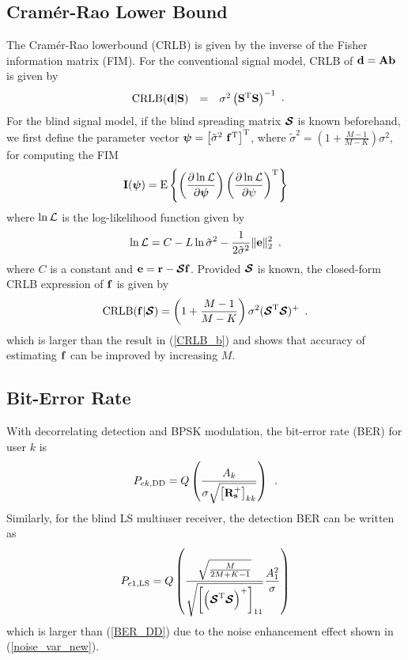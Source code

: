 \documentclass[conference]{IEEEtran}
\newcommand{\br}{{\mathbf r}}
\newcommand{\bA}{{\mathbf A}}
\newcommand{\bb}{{\bf b}}
\newcommand{\bd}{{\bf d}}
\newcommand{\be}{{\bf e}}
\newcommand{\bs}{{\bf s}}
\newcommand{\bbf}{{\bf f}}
\newcommand{\bS}{{\bf S}}
\newcommand{\bI}{{\bf I}}
\newcommand{\bR}{{\bf R}}
\newcommand{\bpsi}{{\mbox {\boldmath $\psi$}}}
\newcommand{\bcS}{{\mbox {\boldmath ${\cal S}$}}}
\begin{document}
\subsection{Cram\'{e}r-Rao Lower Bound}

The Cram\'{e}r-Rao lowerbound (CRLB) is given by the inverse of the Fisher information matrix (FIM). For the conventional signal model, CRLB of
$\bd=\bA\bb$  is given by
\begin{equation}
\begin{array}{rcl}
{\rm CRLB}(\bd | \bS)&=&\sigma^{2}\left(\bS^{\rm
T}\bS\right)^{\rm -1}
\end{array}.\label{CRLB_b}
\end{equation}
For the blind signal model, if the blind spreading matrix
$\bcS$ is known beforehand, we first define the parameter vector
$\bpsi = \left[\tilde{\sigma}^{2}\ \bbf^{\rm
T}\right]^{\rm T}$, where $\tilde{\sigma}^{2}
=\left(1+\frac{M-1}{M-K}\right)\sigma^{2}$, for computing the FIM
\begin{equation}
{\bI(\bpsi)} = {\rm E} \left\{ \left( \frac{\partial
\ln{\cal L}}{\partial \bpsi} \right) \left( \frac{\partial
\ln{\cal L}}{\partial \psi} \right)^{\rm T} \right\}
\label{fim}
\end{equation}
where $\ln{\cal L}$ is the log-likelihood function given
by
\begin{equation}
\ln{\cal
L} = C - L\ln\tilde{\sigma}^2-\frac{1}{2\tilde{\sigma}^2} \| \be \|_2^2 \enspace .
\label{logl}
\end{equation}
where $C$ is a constant and $\mathbf{e}=\br-\bcS\bbf$.
Provided $\bcS$ is known, the closed-form CRLB expression of
$\bbf$ is given by
\begin{equation}
{\rm CRLB}(\bbf |\bcS) = \left(1+\frac{M-1}{M-K}\right)\sigma^{2}(\bcS^{\rm T}\bcS)^{\rm +}
\enspace .
\label{CRLB_f}
\end{equation}
which is larger than the result in (\ref{CRLB_b}) and shows that accuracy of estimating $\bbf$ can be improved by increasing $M$.

\subsection{Bit-Error Rate}

With decorrelating detection and BPSK modulation, the bit-error
rate (BER) for user $k$ is
\begin{equation}
P_{ek,\rm\small DD}  =
Q\left(\frac{A_{k}}{\sigma\sqrt{\left[\bR_{\bs}^{+}\right]_{kk}}}\right)
\enspace .
\label{BER_DD}
\end{equation}
Similarly, for the blind LS multiuser receiver, the
detection BER can be written as
\begin{equation}
P_{e1,\rm\small LS}  =
Q\left(\frac{\sqrt{\frac{M}{2M+K-1}}}{\sqrt{\left[\left(\bcS^{\rm
T}\bcS\right)^{+}\right]_{11}}}\frac{A_1^2}{\sigma}\right)
\label{BER_LS}
\end{equation}
which is larger than (\ref{BER_DD}) due to the noise enhancement effect shown in (\ref{noise_var_new}).
\end{document}

